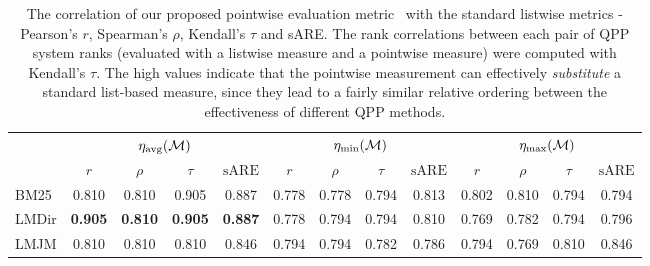 \begin{table}[!b]
\centering
\caption{
\footnotesize
The correlation of our proposed pointwise evaluation metric \proposed~with the standard listwise metrics - Pearson's $r$, Spearman's $\rho$, Kendall's $\tau$ and sARE. The rank correlations between each pair of QPP system ranks (evaluated with a listwise measure and a pointwise measure) were computed with Kendall's $\tau$.
The high values indicate that the pointwise measurement can effectively \textit{substitute} a standard list-based measure, since they lead to a fairly similar relative ordering between the effectiveness of different QPP methods.
}
\begin{adjustbox}{width=0.75\columnwidth}
\begin{tabular}{@{}l@{~~}c@{~~}c@{~~}c@{~~}c@{~~~~}c@{~~}c@{~~}c@{~~}c@{~~~~}c@{~~}c@{~~}c@{~~}c@{}}
\toprule
&\multicolumn{4}{c}{ $\eta_\text{avg}(\mathcal{M})$}
&\multicolumn{4}{c}{ $\eta_\text{min}(\mathcal{M})$}
&\multicolumn{4}{c}{ $\eta_\text{max}(\mathcal{M})$}
\\

\cmidrule(r){2-5}
\cmidrule(r){6-9}
\cmidrule(r){10-13}

& \multicolumn{1}{c}{$r$} 
& \multicolumn{1}{c}{$\rho$} 
& \multicolumn{1}{c}{$\tau$}
& \multicolumn{1}{c}{$\text{sARE}$}
& \multicolumn{1}{c}{$r$} 
& \multicolumn{1}{c}{$\rho$} 
& \multicolumn{1}{c}{$\tau$}
& \multicolumn{1}{c}{$\text{sARE}$}
& \multicolumn{1}{c}{$r$} 
& \multicolumn{1}{c}{$\rho$} 
& \multicolumn{1}{c}{$\tau$}
& \multicolumn{1}{c}{$\text{sARE}$}
\\

\midrule
BM25 
& 0.810 & 0.810 & 0.905 & 0.887 
& 0.778 & 0.778 & 0.794 & 0.813 
& 0.802 & 0.810 & 0.794 & 0.794 \\

LMDir\;\;\;
& \textbf{0.905} & \textbf{0.810} & \textbf{0.905} & \textbf{0.887} 
& 0.778 & 0.794 & 0.794 & 0.810 
& 0.769 & 0.782 & 0.794 & 0.796 \\

LMJM 
& 0.810 & 0.810 & 0.810 & 0.846 
& 0.794 & 0.794 & 0.782 & 0.786 
& 0.794 & 0.769 & 0.810 & 0.846 \\
\bottomrule
\end{tabular}
\end{adjustbox}
\label{tab:stable}
\end{table}
